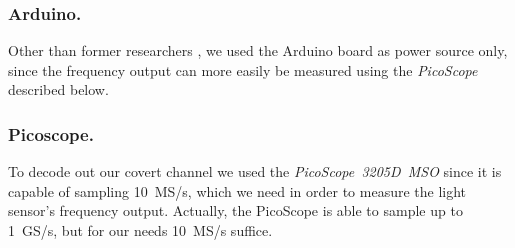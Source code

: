 \subsubsection{Arduino.} Other than former researchers \cite{Ronen:2016:EFAIDCSL}, we used the Arduino board as power source only, since the frequency output can more easily be measured using the \textit{PicoScope} described below. 

\subsubsection{Picoscope.} To decode out our covert channel we used the \textit{PicoScope~3205D~MSO} since it is capable of sampling 10~MS/s, which we need in order to measure the light sensor's frequency output. Actually, the PicoScope is able to sample up to 1~GS/s, but for our needs 10~MS/s suffice.

